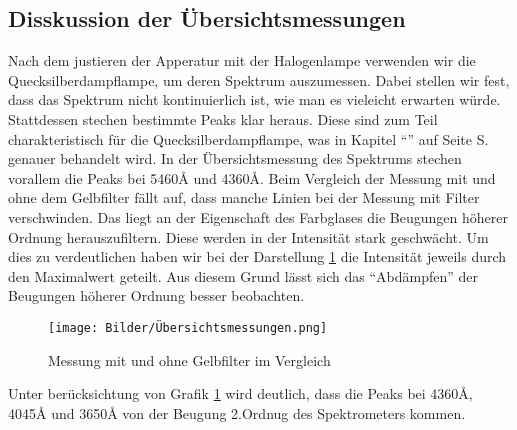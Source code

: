 \subsection{Disskussion der Übersichtsmessungen}

Nach dem justieren der Apperatur mit der Halogenlampe verwenden wir die Quecksilberdampflampe, um deren Spektrum auszumessen.
Dabei stellen wir fest, dass das Spektrum nicht kontinuierlich ist, wie man es vieleicht erwarten würde.
Stattdessen stechen bestimmte Peaks klar heraus. Diese sind zum Teil charakteristisch für die Quecksilberdampflampe, was in 
Kapitel "`"' auf Seite S.\pageref{Messlit} genauer behandelt wird.\newline
In der Übersichtsmessung des Spektrums stechen vorallem die Peaks bei 5460\r{A} und 4360\r{A}.
Beim Vergleich der Messung mit und ohne dem Gelbfilter fällt auf, dass manche Linien bei der Messung mit Filter verschwinden. Das liegt an der Eigenschaft des 
Farbglases die Beugungen höherer Ordnung herauszufiltern. Diese werden in der Intensität stark geschwächt. Um dies zu verdeutlichen haben wir bei der Darstellung \ref{Übersichtsmessungen}  die Intensität
jeweils durch den Maximalwert geteilt. Aus diesem Grund lässt sich das "`Abdämpfen"' der Beugungen höherer Ordnung besser  beobachten.

\begin{figure}[h]
    \centering
    \texttt{[image: Bilder/Übersichtsmessungen.png]}
    \caption{Messung mit und ohne Gelbfilter im Vergleich}
    \label{Übersichtsmessungen}
\end{figure}

Unter berücksichtung von Grafik \ref{Übersichtsmessungen} wird deutlich, dass die Peaks bei 4360\r{A}, 4045\r{A} und 3650\r{A} von der Beugung 2.Ordnug des Spektrometers kommen.